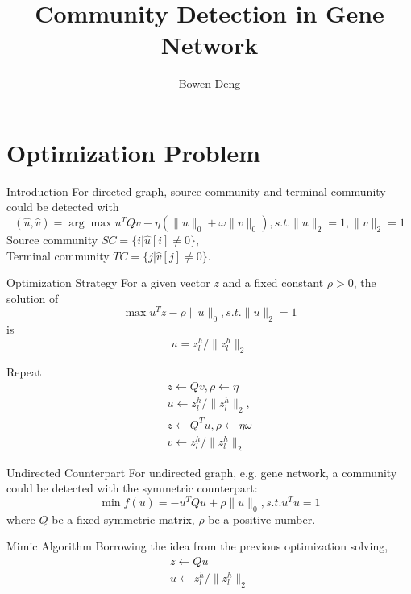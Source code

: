 \documentclass[xcolor=dvipsnames]{beamer}
\begin{document}
\title{Community Detection in Gene Network}
\author{Bowen Deng}
\date{}
\begin{frame}
\maketitle
\end{frame}
\begin{frame}
\tableofcontents
\end{frame}
\section{Optimization Problem}
\begin{frame}{Introduction}
For directed graph, source community and terminal community could be detected with
\[
(\hat{u},\hat{v})=\arg\max u^TQv-\eta(\|u\|_0+\omega\|v\|_0), s.t. \|u\|_2=1, \|v\|_2=1
\]
Source community $SC=\{i|\hat{u}[i]\neq0\}$,\\
Terminal community $TC=\{j|\hat{v}[j]\neq0\}$.\\
\end{frame}
\begin{frame}{Optimization Strategy}
For a given vector $z$ and a fixed constant $\rho>0$, the solution of
\[
\max u^Tz-\rho\|u\|_0, s.t. \|u\|_2=1
\]
is
\[
u=z_l^h/\|z_l^h\|_2
\]
\end{frame}
\begin{frame}
Repeat
\begin{eqnarray}
z\leftarrow Qv, \rho\leftarrow\eta\nonumber\\
u\leftarrow z_l^h/\|z_l^h\|_2,\nonumber\\
z\leftarrow Q^Tu, \rho\leftarrow\eta\omega\nonumber\\
v\leftarrow z_l^h/\|z_l^h\|_2\nonumber
\end{eqnarray}
\end{frame}
\begin{frame}{Undirected Counterpart}
For undirected graph, e.g. gene network, a community could be detected with the symmetric counterpart:\\
\[
\min f(u)=-u^TQu+\rho\|u\|_0, s.t. u^Tu=1
\]
where $Q$ be a fixed symmetric matrix, $\rho$ be a positive number.\\
\end{frame}
\begin{frame}{Mimic Algorithm}
Borrowing the idea from the previous optimization solving,
\begin{eqnarray}
z\leftarrow Qu \nonumber\\
u\leftarrow z_l^h/\|z_l^h\|_2\nonumber
\end{eqnarray}
\end{frame}
\end{document}

